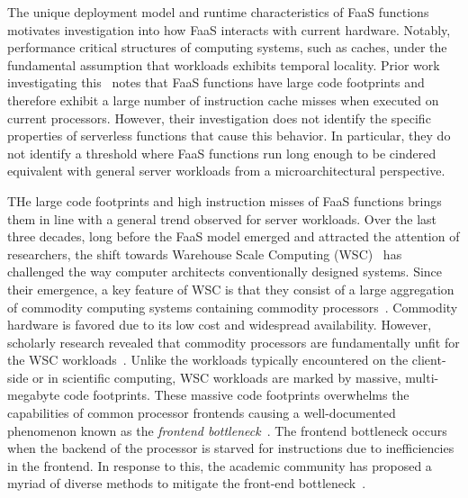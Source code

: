 \documentclass[../main.tex]{subfiles}
\begin{document}
\begin{refsection}
The unique deployment model and runtime characteristics of FaaS
functions motivates investigation into how FaaS interacts with current
hardware. Notably, performance critical structures of computing
systems, such as caches, under the fundamental assumption that
workloads exhibits temporal locality. Prior work investigating
this~\cite{lukewarm_serverless} notes that FaaS functions have large
code footprints and therefore exhibit a large number of instruction
cache misses when executed on current processors. However, their
investigation does not identify the specific properties of serverless
functions that cause this behavior. In particular, they do not
identify a threshold where FaaS functions run long enough to be
cindered equivalent with general server workloads from a
microarchitectural perspective.

THe large code footprints and high instruction misses of FaaS
functions brings them in line with a general trend observed for server
workloads. Over the last three decades, long before the FaaS model
emerged and attracted the attention of researchers, the shift towards
Warehouse Scale Computing (WSC)~\cite{barroso18_datac_as_comput} has
challenged the way computer architects conventionally designed
systems. Since their emergence, a key feature of WSC is that they
consist of a large aggregation of commodity computing systems
containing commodity
processors~\cite{barroso03_web_searc_planet}. Commodity hardware is
favored due to its low cost and widespread availability. However,
scholarly research revealed that commodity processors are
fundamentally unfit for the WSC
workloads~\cite{ferdman12_clear_cloud,kanev15_profil}. Unlike the
workloads typically encountered on the client-side or in scientific
computing, WSC workloads are marked by massive, multi-megabyte code
footprints. These massive code footprints overwhelms the capabilities
of common processor frontends causing a well-documented phenomenon
known as the \emph{frontend
  bottleneck}~\cite{ailamaki99_dbmss_moder_proces,keeton98_perfor_charac_quad_pentium_pro,ranganathan98_perfor_datab_workl_shared_memor}. The
frontend bottleneck occurs when the backend of the processor is
starved for instructions due to inefficiencies in the frontend. In
response to this, the academic community has proposed a myriad of
diverse methods to mitigate the front-end
bottleneck~\cite{reinman99_fetch_direc_instr_prefet,kumar17_boomer,kumar18_blast_throug_front_end_bottl_with_shotg,kumar20_shoot_down_server_front_end_bottl,ferdman08_tempor,ferdman11_proac_instr_fetch,kaynak13_shift,kaynak15_confl,ayers19_asmdb,ajorpaz18_explor_predic_replac_polic_instr,khan20_i_spy,soundararajan21_pdede,ansari20_divid,khan21_rippl,}.




\end{refsection}
\end{document}
